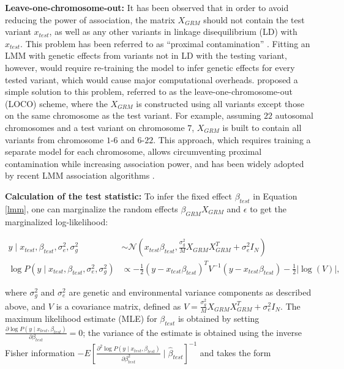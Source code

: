 \textbf{Leave-one-chromosome-out: }
%
It has been observed that in order to avoid reducing the power of association, the matrix $X_{GRM}$ should not contain the test variant $x_{test}$, as well as any other variants in linkage disequilibrium (LD) with $x_{test}$.
%
This problem has been referred to as ``proximal contamination'' \cite{listgarten2012improved}.
%
Fitting an LMM with genetic effects from variants not in LD with the testing variant, however, would require re-training the model to infer genetic effects for every tested variant, which would cause major computational overheads.
%
\cite{yang2014advantages} proposed a simple solution to this problem, referred to as the leave-one-chromosome-out (LOCO) scheme, where the $X_{GRM}$ is constructed using all variants except those on the same chromosome as the test variant.
%
For example, assuming $22$ autosomal chromosomes and a test variant on chromosome $7$, $X_{GRM}$ is built to contain all variants from chromosome $1$-$6$ and $6$-$22$.
%
This approach, which requires training a separate model for each chromosome, allows circumventing proximal contamination while increasing association power, and has been widely adopted by recent LMM association algorithms \cite{loh2015efficient,loh2018mixed,jiang2019resource}.
%

\textbf{Calculation of the test statistic: }
%
To infer the fixed effect $\beta_{test}$ in Equation \ref{lmm}, one can marginalize the random effects $\beta_{GRM}X_{GRM}$ and $\epsilon$ to get the marginalized log-likelihood:

\begin{align}
    y \mid x_{test}, \beta_{test}, \sigma_e^2, \sigma_g^2 &\sim \mathcal{N}(x_{test}\beta_{test}, \frac{\sigma_g^2}{M} X_{GRM}X_{GRM}^T + \sigma_e^2 I_N) \nonumber \\
    \log P(y \mid x_{test}, \beta_{test}, \sigma_e^2, \sigma_g^2) &\propto -\frac{1}{2} (y-x_{test}\beta_{test})^TV^{-1}(y-x_{test}\beta_{test}) -\frac{1}{2} \lvert \log(V) \rvert,
\label{eq:full_like}
\end{align}

where $\sigma_g^2$ and $\sigma_e^2$ are genetic and environmental variance components as described above, and $V$ is a covariance matrix, defined as $V = \frac{\sigma_g^2}{M} X_{GRM}X_{GRM}^T + \sigma_e^2 I_N$.
%
The maximum likelihood estimate (MLE) for $\beta_{test}$ is obtained by setting $\frac{\partial \log P(y \mid x_{test}, \beta_{test})}{\partial \beta_{test}} = 0$; the variance of the estimate is obtained using the inverse Fisher information $ -\mathbf{}{E}\left[\frac{\partial ^2 \log P(y \mid x_{test}, \beta_{test})}{\partial \beta_{test}^2} \mid \hat{\beta}_{test}\right]^{-1}$ and takes the form


